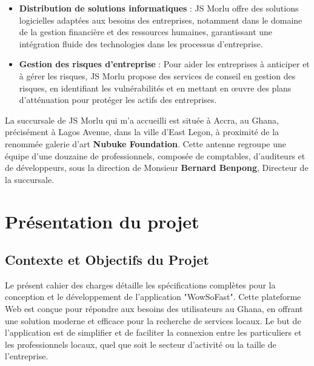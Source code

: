 {\begin{itemize}
\vspace{0.3cm}

\item \textbf{Distribution de solutions informatiques} :
JS Morlu offre des solutions logicielles adaptées aux besoins des entreprises, notamment dans le domaine de la gestion financière et des ressources humaines, garantissant une intégration fluide des technologies dans les processus d’entreprise.

\vspace{0.3cm}

\item \textbf{Gestion des risques d'entreprise} :
Pour aider les entreprises à anticiper et à gérer les risques, JS Morlu propose des services de conseil en gestion des risques, en identifiant les vulnérabilités et en mettant en œuvre des plans d’atténuation pour protéger les actifs des entreprises.

\end{itemize}

\vspace{0.5cm}

La succursale de JS Morlu qui m'a accueilli est située à Accra, au Ghana, précisément à Lagos Avenue, dans la ville d'East Legon, à proximité de la renommée galerie d'art \textbf{Nubuke Foundation}. Cette antenne regroupe une équipe d'une douzaine de professionnels, composée de comptables, d'auditeurs et de développeurs, sous la direction de Monsieur \textbf{Bernard Benpong}, Directeur de la succursale.

\chapter{Présentation du projet}

\section{Contexte et Objectifs du Projet}

Le présent cahier des charges détaille les spécifications complètes pour la conception et le développement de l'application "WowSoFast". Cette plateforme Web est conçue pour répondre aux besoins des utilisateurs au Ghana, en offrant une solution moderne et efficace pour la recherche de services locaux. Le but de l'application est de simplifier et de faciliter la connexion entre les particuliers et les professionnels locaux, quel que soit le secteur d'activité ou la taille de l'entreprise.

}
